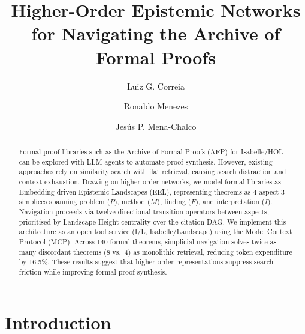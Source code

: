 \documentclass{svproc}
\providecommand{\orcidID}[1]{\unskip}
\begin{document}
\mainmatter

\title{Higher-Order Epistemic Networks for Navigating the Archive of Formal Proofs}

\author{Luiz G. Correia\orcidID{0000-0002-2721-4274} \and
Ronaldo Menezes\orcidID{0000-0003-2475-4709} \and
Jes\'us P. Mena-Chalco\orcidID{0000-0001-7509-5532}}



\maketitle

\begin{abstract}
Formal proof libraries such as the Archive of Formal Proofs (AFP) for Isabelle/HOL can be explored with LLM agents to automate proof synthesis. However, existing approaches rely on similarity search with flat retrieval, causing search distraction and context exhaustion. Drawing on higher-order networks, we model formal libraries as Embedding-driven Epistemic Landscapes (EEL), representing theorems as 4-aspect 3-simplices spanning problem ($P$), method ($M$), finding ($F$), and interpretation ($I$). Navigation proceeds via twelve directional transition operators between aspects, prioritised by Landscape Height centrality over the citation DAG. We implement this architecture as an open tool service (I/L, Isabelle/\allowbreak Landscape) using the Model Context Protocol (MCP). Across 140 formal theorems, simplicial navigation solves twice as many discordant theorems (8 vs.~4) as monolithic retrieval, reducing token expenditure by 16.5\%. These results suggest that higher-order representations suppress search friction while improving formal proof synthesis.
\end{abstract}

\enlargethispage{2\baselineskip}

\section{Introduction}\label{sec:intro}
\end{document}
